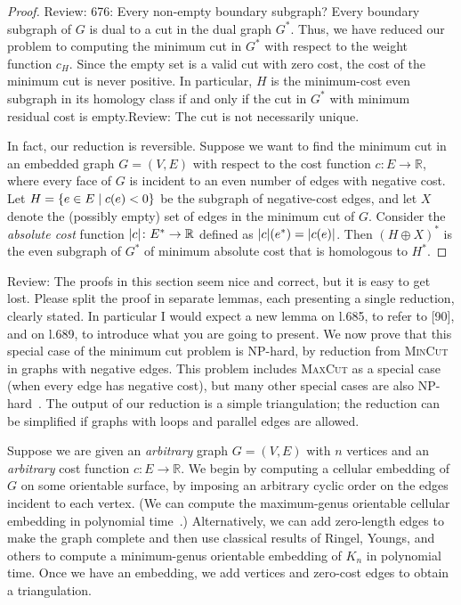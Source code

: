 \documentclass[letterpaper,review]{siamart190516}
\def\Real{\mathbb{R}}
\def\rnote#1{\color{red}Review: #1 \color{black}}
\begin{document}
{\begin{proof}
\rnote{676: Every non-empty boundary subgraph?}
Every boundary subgraph of $G$ is dual to a cut in the dual graph $G^*$.  Thus, we have reduced our problem to computing the minimum cut in $G^*$ with respect to the weight function $c_H$.  Since the empty set is a valid cut with zero cost, the cost of the minimum cut is never positive.  In particular, $H$ is the minimum-cost even subgraph in its homology class if and only if the cut in $G^*$ with minimum residual cost is empty.\rnote{The cut is not necessarily unique. }

In fact, our reduction is reversible.  Suppose we want to find the minimum cut in an embedded graph $G = (V, E)$ with respect to the cost function $c\colon E\to \Real$, where every face of $G$ is incident to an even number of edges with negative cost.  Let $H = \{ {e\in E}\mid {c(e)<0} \}$ be the subgraph of negative-cost edges, and let $X$ denote the (possibly empty) set of edges in the minimum cut of $G$.  Consider the \emph{absolute cost} function $\abs{c}\colon E^*\to \Real$ defined as $\mathopen| c \mathclose|(e^*) = \mathopen| c(e) \mathclose|$.  Then $(H\oplus X)^*$ is the even subgraph of $G^*$ of minimum absolute cost that is homologous to $H^*$.
\end{proof}

\rnote{
The proofs in this section seem nice and correct, but it is easy to get lost. Please split the proof in separate lemmas, each presenting a single reduction, clearly stated. In particular I would expect a new lemma on l.685, to refer to [90], and on l.689, to introduce what you are going to present. 
}
We now prove that this special case of the minimum cut problem is {NP}-hard, by  reduction from \textsc{MinCut} in graphs with negative edges.  This problem includes \textsc{MaxCut} as a special case (when every edge has negative cost), but many other special cases are also {NP}-hard~\cite{mrr-edofm-03}.  The output of our reduction is a simple triangulation; the reduction can be simplified if graphs with loops and parallel edges are allowed.

Suppose we are given an \emph{arbitrary} graph $G = (V,E)$ with $n$ vertices and an \emph{arbitrary} cost function $c\colon E\to \Real$.  We begin by computing a cellular embedding of $G$ on some orientable surface, by imposing an arbitrary cyclic order on the edges incident to each vertex.
(We can compute the maximum-genus orientable cellular embedding  in polynomial time~\cite{fgm-fmggi-88}.)  Alternatively, we can add zero-length edges to make the graph complete and then use classical results of Ringel, Youngs, and others \cite{ry-shmcp-68,r-mct-74} to compute a minimum-genus orientable embedding of $K_n$ in polynomial time.  Once we have an embedding, we add vertices and zero-cost edges to obtain a triangulation.

}
\end{document}
